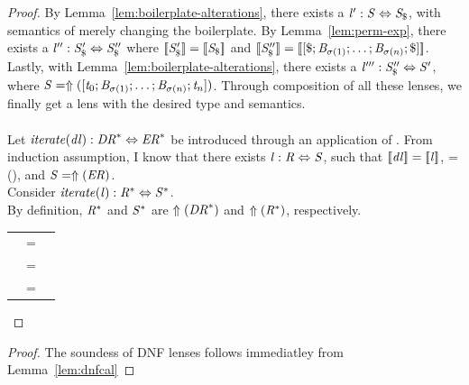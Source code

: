 \documentclass[numbers]{sigplanconf}
\begin{document}
\begin{lemma}
\begin{proof}
By Lemma~\ref{lem:boilerplate-alterations}, there exists a
$\mathit{l}' : \mathit{S} \Leftrightarrow \mathit{S}_{\$}$, with semantics of
merely changing the boilerplate.
By Lemma~\ref{lem:perm-exp}, there exists a $\mathit{l}'' : \mathit{S}_{\$}'
\Leftrightarrow \mathit{S}_{\$}''$ where
$[ \! [\mathit{S}_{\$}'] \! ]=[ \! [\mathit{S}_{\$}] \! ]$ and 
$[ \! [\mathit{S}_{\$}''] \! ]=[ \! [[\$; \mathit{B}_{\sigma(1)} ; \ldots ; \mathit{B}_{\sigma(n)} ; \$]] \! ]$.
Lastly, with Lemma~\ref{lem:boilerplate-alterations}, there exists a
$\mathit{l}''' : \mathit{S}_{\$}'' \Leftrightarrow \mathit{S}'$, where
$\mathit{S} = \Uparrow([\mathit{t}_0; \mathit{B}_{\sigma(1)} ; \ldots ; \mathit{B}_{\sigma(n)} ; \mathit{t}_n])$.
Through composition of all these lenses, we finally get a lens with the desired type
and semantics.\\
\\
Let $\mathit{iterate(\mathit{dl})} : {\mathit{DR}}^* \Leftrightarrow {\ensuremath{\mathit{ER}}}^*$
be introduced through an application of \IterateAtomLensRule{}.
From induction assumption, I know that there exists $\mathit{l} : \mathit{R} \Leftrightarrow \mathit{S}$, such that
$[ \! [\mathit{dl}] \! ]=[ \! [\mathit{l}] \! ]$,
\Regex=\ToRegex(\DNFRegex), and
$\mathit{S}=\Uparrow(\mathit{ER})$.\\
Consider $\mathit{iterate(\mathit{l})} : {\mathit{R}}^* \Leftrightarrow {\ensuremath{\mathit{S}}}^*$.\\
By definition, ${\mathit{R}}^*$ and ${\mathit{S}}^*$ are $\Uparrow({\mathit{DR}}^*)$
and $\Uparrow({\mathit{R}}^*)$, respectively.

\begin{tabular}{RcL}
\SemanticsOf{\IterateLensOf{\Lens}} & = &
\\
& = &
\\
& = &
\SemanticsOf{\IterateLensOf{\DNFLens}}
\end{tabular}
\end{proof}
\end{lemma}

\dnfls*
\begin{proof}

The soundess of DNF lenses follows immediatley from Lemma~\ref{lem:dnfcal}

\end{proof}
\end{document}
